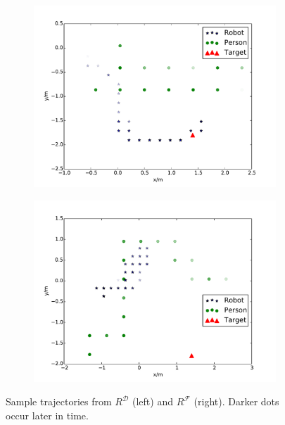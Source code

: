 \documentclass[letterpaper]{article}
\begin{document}
\begin{figure}[t]
\vspace{-2mm}
  \hspace{-10pt}
  \begin{subfigure}{0.22\textwidth}
    \includegraphics[scale = 0.22]{images/gp.pdf}
    \label{fig:good_path}
  \end{subfigure}
  \hspace{10pt}
  \begin{subfigure}{0.22\textwidth}
    \includegraphics[scale = 0.22]{images/bp.pdf}
    \label{fig:bad_path}
\end{subfigure}
\vspace{-4mm}
  \caption{\small{Sample trajectories from $R^\mathcal{D}$ (left) and $R^\mathcal{F}$ (right). Darker dots occur later in time.}} %
  \label{fig:paths}
\vspace{-4mm}
\end{figure}
\end{document}
